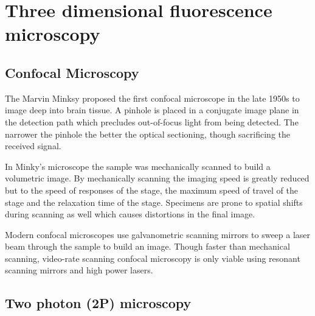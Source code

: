 \section{Three dimensional fluorescence microscopy}
\subsection{Confocal Microscopy}

The Marvin Minksy proposed the first confocal microscope in the late 1950s to image deep into brain tissue.
A pinhole is placed in a conjugate image plane in the detection path which precludes out-of-focus light from being detected.
The narrower the pinhole the better the optical sectioning, though sacrificing the received signal.

In Minky's microscope the sample was mechanically scanned to build a volumetric image.
By mechanically scanning the imaging speed is greatly reduced but to the speed of responses of the stage, the maximum speed of travel of the stage and the relaxation time of the stage.
Specimens are prone to spatial shifts during scanning as well which causes distortions in the final image.

Modern confocal microscopes use galvanometric scanning mirrors to sweep a laser beam through the sample to build an image.
Though faster than mechanical scanning, video-rate scanning confocal microscopy is only viable using resonant scanning mirrors and high power lasers.

%

\subsection{Two photon (2P) microscopy}

